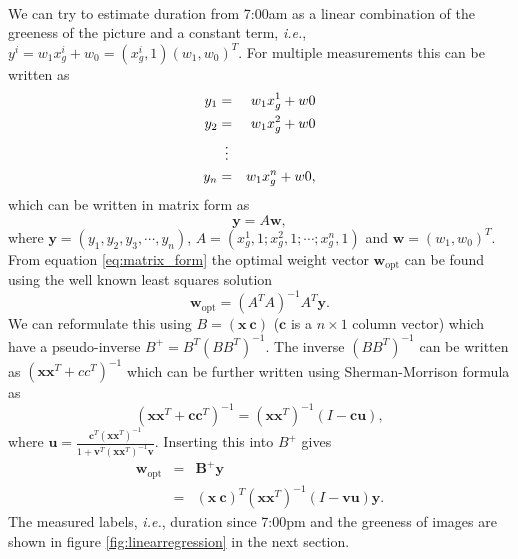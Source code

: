 \documentclass[article,11pt]{article}
\begin{document}
\\
We can try to estimate duration from 7:00am as a linear combination of the greeness of the picture and a constant term, \textit{i.e.}, $y^i= w_1x_g^i + w_0 = (x_g^i, 1)(w_1, w_0)^T$. For multiple measurements this can be written as
\begin{eqnarray}
  y_1 &=& w_1x_g^1 + w0\nonumber\\
  y_2 &=& w_1x_g^2 + w0\nonumber\\
  &\mathrel{\makebox[\widthof{=}]{\vdots}}\nonumber \\
  y_n &=& w_1x_g^n + w0,
\label{eq:equation-array}
\end{eqnarray}
which can be written in matrix form as
\begin{equation}
  \mathbf{y} = A\mathbf{w},
  \label{eq:matrix_form}
\end{equation}
where $\mathbf{y} = (y_1, y_2, y_3,\cdots,y_n)$, $A = (x_g^1,1; x_g^2,1;\cdots;x_g^n,1)$ and $\mathbf{w} = (w_1,w_0)^T$. From equation \ref{eq:matrix_form} the optimal weight vector $\mathbf{w}_{\mathrm{opt}}$ can be found using the well known least squares solution
\begin{equation}
  \mathbf{w}_{\mathrm{opt}} = (A^TA)^{-1}A^T\mathbf{y}.
  \label{eq:least-squares-solution}
\end{equation}
We can reformulate this using $B=(\mathbf{x}\:\mathbf{c})$ ($\mathbf{c}$
is a $n\times 1$ column vector) which have a pseudo-inverse $B^+=B^T(BB^T)^{-1}$.
The inverse $(BB^T)^{-1}$ can be written as $(\mathbf{x}\mathbf{x}^T + cc^T)^{-1}$
which can be further written using Sherman-Morrison formula as
\begin{equation}
  (\mathbf{x}\mathbf{x}^T+\mathbf{c}\mathbf{c}^T)^{-1}=(\mathbf{x}\mathbf{x}^T)^{-1}(I-\mathbf{c}\mathbf{u}),
  \label{eq:sherman-morrison}
\end{equation}
where $\mathbf{u} = \frac{\mathbf{c}^T(\mathbf{x}\mathbf{x}^T)^{-1}}{1+\mathbf{v}^T(\mathbf{x}\mathbf{x}^T)^{-1}\mathbf{v}}$. Inserting this into $B^+$ gives
\begin{eqnarray}
  \mathbf{w}_{\mathrm{opt}}&=&\mathbf{B}^+\mathbf{y}\nonumber\\
  &=&(\mathbf{x}\:\mathbf{c})^T(\mathbf{x}\mathbf{x}^T)^{-1}(I-\mathbf{v}\mathbf{u})\mathbf{y}.
\label{eq:closed-form-x}
\end{eqnarray}
The measured labels, \textit{i.e.}, duration since 7:00pm and the greeness of
images are shown in figure \ref{fig:linearregression} in the next section.
\end{document}
